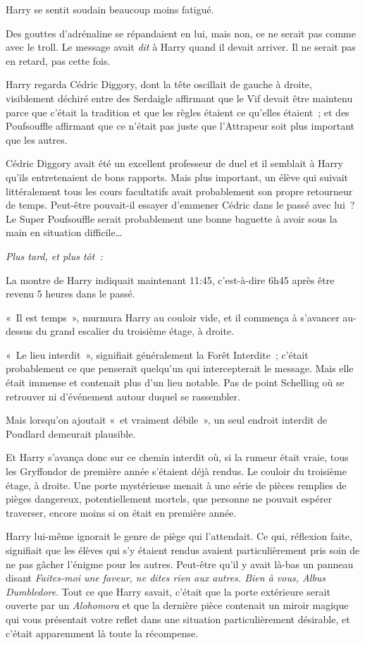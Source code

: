 Harry se sentit soudain beaucoup moins fatigué.

Des gouttes d'adrénaline se répandaient en lui, mais non, ce ne serait pas comme avec le troll.
Le message avait \emph{dit} à Harry quand il devait arriver.
Il ne serait pas en retard, pas cette fois.

Harry regarda Cédric Diggory, dont la tête oscillait de gauche à droite, visiblement déchiré entre des Serdaigle affirmant que le Vif devait être maintenu parce que c'était la tradition et que les règles étaient ce qu'elles étaient~; et des Poufsouffle affirmant que ce n'était pas juste que l'Attrapeur soit plus important que les autres.

Cédric Diggory avait été un excellent professeur de duel et il semblait à Harry qu'ils entretenaient de bons rapports.
Mais plus important, un élève qui suivait littéralement tous les cours facultatifs avait probablement son propre retourneur de temps.
Peut-être pouvait-il essayer d'emmener Cédric dans le passé avec lui~?
Le Super Poufsouffle serait probablement une bonne baguette à avoir sous la main en situation difficile…

\later

\emph{Plus tard, et plus tôt~:}

La montre de Harry indiquait maintenant 11:45, c'est-à-dire 6h45 après être revenu 5 heures dans le passé.

«~Il est temps~», murmura Harry au couloir vide, et il commença à s'avancer au-dessus du grand escalier du troisième étage, à droite.

«~Le lieu interdit~», signifiait généralement la Forêt Interdite~; c'était probablement ce que penserait quelqu'un qui intercepterait le message.
Mais elle était immense et contenait plus d'un lieu notable.
Pas de point Schelling où se retrouver ni d'événement autour duquel se rassembler.

Mais lorsqu'on ajoutait «~et vraiment débile~», un seul endroit interdit de Poudlard demeurait plausible.

Et Harry s'avança donc sur ce chemin interdit où, si la rumeur était vraie, tous les Gryffondor de première année s'étaient déjà rendus.
Le couloir du troisième étage, à droite.
Une porte mystérieuse menait à une série de pièces remplies de pièges dangereux, potentiellement mortels, que personne ne pouvait espérer traverser, encore moins si on était en première année.

Harry lui-même ignorait le genre de piège qui l'attendait.
Ce qui, réflexion faite, signifiait que les élèves qui s'y étaient rendus avaient particulièrement pris soin de ne pas gâcher l'énigme pour les autres.
Peut-être qu'il y avait là-bas un panneau disant \emph{Faites-moi une faveur, ne dites rien aux autres.
Bien à vous, Albus Dumbledore}.
Tout ce que Harry savait, c'était que la porte extérieure serait ouverte par un \emph{Alohomora} et que la dernière pièce contenait un miroir magique qui vous présentait votre reflet dans une situation particulièrement désirable, et c'était apparemment là toute la récompense.

